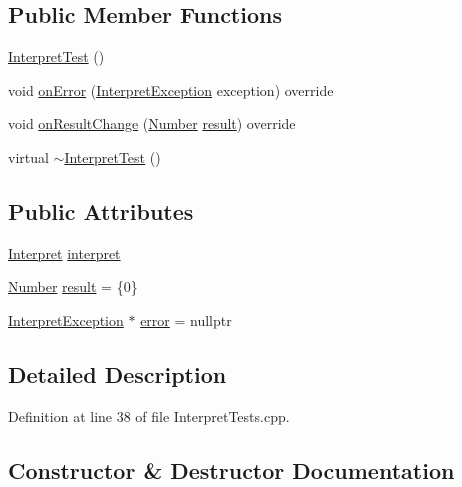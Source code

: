 \subsection*{Public Member Functions}
\begin{DoxyCompactItemize}
\item 
\hyperlink{struct_interpret_test_af1827c5b47519fbc03c10a7ed1591d44}{Interpret\+Test} ()
\item 
void \hyperlink{struct_interpret_test_a8dd2550d1b3e604db0230c2a3f4807a5}{on\+Error} (\hyperlink{class_interpret_exception}{Interpret\+Exception} exception) override
\item 
void \hyperlink{struct_interpret_test_af3c7dfecc5779919bf629c558c696548}{on\+Result\+Change} (\hyperlink{classteam22_1_1_math_1_1_number}{Number} \hyperlink{struct_interpret_test_a8a1290387dfa72192d3ea06873ff8e73}{result}) override
\item 
virtual \hyperlink{struct_interpret_test_abd93b9443a1b18087a2c879e7664af00}{$\sim$\+Interpret\+Test} ()
\end{DoxyCompactItemize}
\subsection*{Public Attributes}
\begin{DoxyCompactItemize}
\item 
\hyperlink{classteam22_1_1_calc_1_1_interpret}{Interpret} \hyperlink{struct_interpret_test_a3905fe89984120323e1dd28b2abd6052}{interpret}
\item 
\hyperlink{classteam22_1_1_math_1_1_number}{Number} \hyperlink{struct_interpret_test_a8a1290387dfa72192d3ea06873ff8e73}{result} = \{0\}
\item 
\hyperlink{class_interpret_exception}{Interpret\+Exception} $\ast$ \hyperlink{struct_interpret_test_aace2257ef8c92219d240f5e2e430bd2b}{error} = nullptr
\end{DoxyCompactItemize}


\subsection{Detailed Description}


Definition at line 38 of file Interpret\+Tests.\+cpp.



\subsection{Constructor \& Destructor Documentation}
\mbox{\label{struct_interpret_test_af1827c5b47519fbc03c10a7ed1591d44}} 
